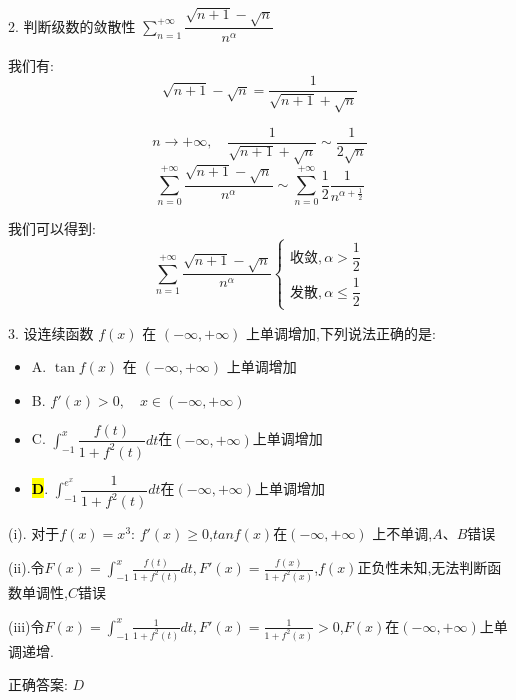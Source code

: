 
2. 判断级数的敛散性 $\sum\limits_{n=1}^{+\infty}\dfrac{\sqrt{n+1}-\sqrt{n}}{n^{\alpha}}$
\begin{solution}
	我们有: 
	$$\sqrt{n+1}-\sqrt{n}=\dfrac{1}{\sqrt{n+1}+\sqrt{n}}$$
	
	$$n\rightarrow  +\infty,\quad \frac{1}{\sqrt{n+1}+\sqrt{n}}\sim\frac{1}{2\sqrt{n}}$$
	$$\sum\limits_{n=0}^{+\infty}\frac{\sqrt{n+1}-\sqrt{n}}{n^{\alpha}}\sim\sum\limits_{n=0}^{+\infty}\frac{1}{2}\frac{1}{n^{\alpha+\frac{1}{2}}}$$
	
	我们可以得到: 
	$$\sum\limits_{n=1}^{+\infty}\frac{\sqrt{n+1}-\sqrt{n}}{n^{\alpha}}\left\lbrace 
	\begin{array}{l}
		\text{收敛},\alpha>\dfrac{1}{2}\\
		\text{发散},\alpha \leq \dfrac{1}{2}
	\end{array}
	\right. $$
\end{solution}


3. 设连续函数 $f(x)$ 在 $(-\infty,+\infty)$ 上单调增加,下列说法正确的是: 
\begin{itemize}
	\item A. $\tan f(x)$ 在 $(-\infty,+\infty)$ 上单调增加
	\item B. $f'(x)>0,\quad x\in(-\infty,+\infty)$
	\item C. $\int_{-1}^{x}\dfrac{f(t)}{1+f^{2}(t)}dt$在$(-\infty,+\infty)$上单调增加
	\item \hl{\textbf{D}}. $\int_{-1}^{e^x}\dfrac{1}{1+f^{2}(t)}dt$在$(-\infty,+\infty)$上单调增加
\end{itemize}
\begin{solution}
	
(i). 对于$f(x)=x^3$: $f'(x)\geq 0$,$tan f(x)$在$(-\infty,+\infty)$ 上不单调,$A\text{、}B$错误
	
(ii).令$F(x)=\int_{-1}^{x}\frac{f(t)}{1+f^{2}(t)}dt,F'(x)=\frac{f(x)}{1+f^{2}(x)}$,$f(x)$正负性未知,无法判断函数单调性,$C$错误
	
(iii)令$F(x)=\int_{-1}^{x}\frac{1}{1+f^{2}(t)}dt,F'(x)=\frac{1}{1+f^{2}(x)}>0$,$F(x)$在$(-\infty,+\infty)$上单调递增.
	
正确答案: $D$
\end{solution}


